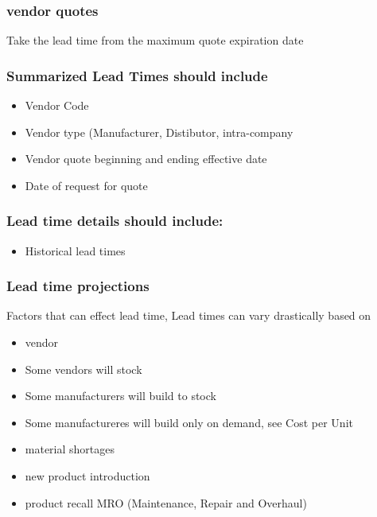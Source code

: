 \documentclass[letterpaper,10pt,english]{sphinxmanual}
\begin{document}
\subsubsection{vendor quotes}
\label{\detokenize{750-Requisitions:vendor-quotes}}
Take the lead time from the maximum quote expiration date


\subsubsection{Summarized Lead Times should include}
\label{\detokenize{750-Requisitions:summarized-lead-times-should-include}}\begin{itemize}
\item {} 
Vendor Code

\item {} 
Vendor type (Manufacturer, Distibutor, intra-company

\item {} 
Vendor quote beginning and ending effective date

\item {} 
Date of request for quote

\end{itemize}


\subsubsection{Lead time details should include:}
\label{\detokenize{750-Requisitions:lead-time-details-should-include}}\begin{itemize}
\item {} 
Historical lead times

\end{itemize}


\subsubsection{Lead time projections}
\label{\detokenize{750-Requisitions:lead-time-projections}}
Factors that can effect lead time, Lead times can vary drastically based
on
\begin{itemize}
\item {} 
vendor

\item {} 
Some vendors will stock

\item {} 
Some manufacturers will build to stock

\item {} 
Some manufactureres will build only on demand, see Cost per Unit

\item {} 
material shortages

\item {} 
new product introduction

\item {} 
product recall MRO (Maintenance, Repair and Overhaul)

\end{itemize}
\end{document}
